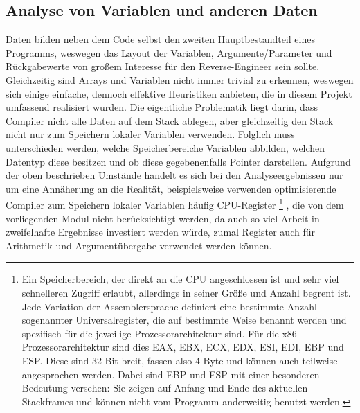 \documentclass[11pt]{article} %
\begin{document}
\subsection{Analyse von Variablen und anderen Daten} Daten bilden neben dem Code selbst den zweiten
Hauptbestandteil eines Programms, weswegen das Layout der Variablen, Argumente/Parameter und
Rückgabewerte von großem Interesse für den Reverse-Engineer sein sollte. Gleichzeitig sind Arrays
und Variablen nicht immer trivial zu erkennen, weswegen sich einige einfache, dennoch effektive
Heuristiken anbieten, die in diesem Projekt umfassend realisiert wurden. Die eigentliche Problematik
liegt darin, dass Compiler nicht alle Daten auf dem Stack ablegen, aber gleichzeitig den Stack nicht
nur zum Speichern lokaler Variablen verwenden. Folglich muss unterschieden werden, welche
Speicherbereiche Variablen abbilden, welchen Datentyp diese besitzen und ob diese gegebenenfalls
Pointer darstellen. Aufgrund der oben beschrieben Umstände handelt es sich bei den
Analyseergebnissen nur um eine Annäherung an die Realität, beispielsweise verwenden optimisierende
Compiler zum Speichern lokaler Variablen häufig CPU-Register
\footnote{Ein Speicherbereich, der direkt an die CPU angeschlossen ist und sehr viel schnelleren
Zugriff erlaubt, allerdings in seiner Größe und Anzahl begrent ist. Jede Variation der
Assemblersprache definiert eine bestimmte Anzahl sogenannter Universalregister, die auf bestimmte
Weise benannt werden und spezifisch für die jeweilige Prozessorarchitektur sind. Für die
x86-Prozessorarchitektur sind dies EAX, EBX, ECX, EDX, ESI, EDI, EBP und ESP. Diese sind 32 Bit
breit, fassen also 4 Byte und können auch teilweise angesprochen werden. Dabei sind EBP und ESP mit
einer besonderen Bedeutung versehen: Sie zeigen auf Anfang und Ende des aktuellen Stackframes und
können nicht vom Programm anderweitig benutzt werden.}
, die von dem vorliegenden
Modul nicht berücksichtigt werden, da auch so viel Arbeit in zweifelhafte Ergebnisse investiert
werden würde, zumal Register auch für Arithmetik und Argumentübergabe verwendet werden können.
\end{document}
